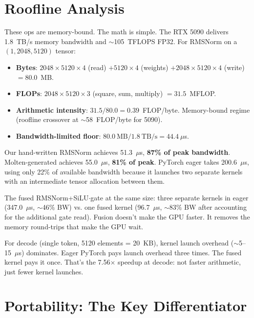 \documentclass[11pt,a4paper]{article}
\begin{document}
\section{Roofline Analysis}

These ops are memory-bound. The math is simple. The RTX 5090 delivers
1.8~TB/s memory bandwidth and $\sim$105~TFLOPS FP32. For RMSNorm on a
$(1, 2048, 5120)$ tensor:

\begin{itemize}
  \item \textbf{Bytes}: $2048 \times 5120 \times 4$ (read) $+ 5120 \times 4$ (weights)
    $+ 2048 \times 5120 \times 4$ (write) $= 80.0$~MB.
  \item \textbf{FLOPs}: $2048 \times 5120 \times 3$ (square, sum, multiply) $= 31.5$~MFLOP.
  \item \textbf{Arithmetic intensity}: $31.5 / 80.0 = 0.39$~FLOP/byte.
    Memory-bound regime (roofline crossover at $\sim$58~FLOP/byte for 5090).
  \item \textbf{Bandwidth-limited floor}: $80.0~\text{MB} / 1.8~\text{TB/s} = 44.4~\mu$s.
\end{itemize}

Our hand-written RMSNorm achieves 51.3~$\mu$s, \textbf{87\% of peak bandwidth}.
Molten-generated achieves 55.0~$\mu$s, \textbf{81\% of peak}. PyTorch eager
takes 200.6~$\mu$s, using only 22\% of available bandwidth because it launches
two separate kernels with an intermediate tensor allocation between them.

The fused RMSNorm+SiLU$\cdot$gate at the same size: three separate kernels
in eager (347.0~$\mu$s, $\sim$46$\%$ BW) vs. one fused kernel (96.7~$\mu$s,
$\sim$83$\%$ BW after accounting for the additional gate read). Fusion doesn't
make the GPU faster. It removes the memory round-trips that make the GPU wait.

For decode (single token, 5120 elements = 20~KB), kernel launch overhead
($\sim$5--15~$\mu$s) dominates. Eager PyTorch pays launch overhead three times.
The fused kernel pays it once. That's the 7.56$\times$ speedup at decode: not
faster arithmetic, just fewer kernel launches.

\section{Portability: The Key Differentiator}
\end{document}
